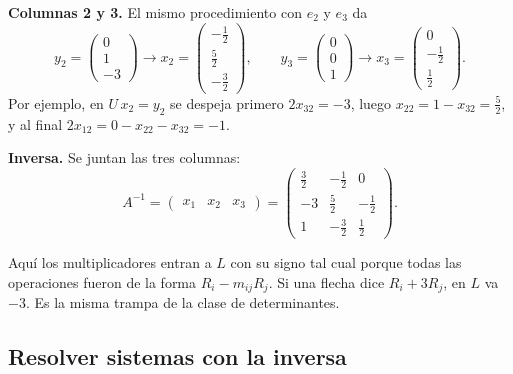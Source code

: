 \documentclass[11pt,letterpaper]{article}
\begin{document}
\begin{ejemplo}
    \textbf{Columnas 2 y 3.} El mismo procedimiento con $e_2$ y $e_3$
    da
    \[
        y_2 = \begin{pmatrix} 0 \\ 1 \\ -3 \end{pmatrix}
        \to
        x_2 = \begin{pmatrix} -\tfrac{1}{2} \\[2pt] \tfrac{5}{2} \\[2pt]
                              -\tfrac{3}{2} \end{pmatrix} ,
        \qquad
        y_3 = \begin{pmatrix} 0 \\ 0 \\ 1 \end{pmatrix}
        \to
        x_3 = \begin{pmatrix} 0 \\[2pt] -\tfrac{1}{2} \\[2pt]
                              \tfrac{1}{2} \end{pmatrix} .
    \]
    Por ejemplo, en $U\,x_2 = y_2$ se despeja primero
    $2x_{32} = -3$, luego $x_{22} = 1 - x_{32} = \tfrac{5}{2}$, y al
    final $2x_{12} = 0 - x_{22} - x_{32} = -1$.

    \textbf{Inversa.} Se juntan las tres columnas:
    \[
        A^{-1} = \begin{pmatrix} x_1 & x_2 & x_3 \end{pmatrix}
        = \begin{pmatrix}
            \tfrac{3}{2} & -\tfrac{1}{2} & 0 \\[2pt]
            -3 & \tfrac{5}{2} & -\tfrac{1}{2} \\[2pt]
            1 & -\tfrac{3}{2} & \tfrac{1}{2}
        \end{pmatrix} .
    \]
\end{ejemplo}

\begin{ojo}
    Aquí los multiplicadores entran a $L$ con su signo tal cual porque
    todas las operaciones fueron de la forma $R_i - m_{ij}R_j$. Si una
    flecha dice $R_i + 3R_j$, en $L$ va $-3$. Es la misma trampa de la
    clase de determinantes.
\end{ojo}


\subsection*{Resolver sistemas con la inversa}
\end{document}
